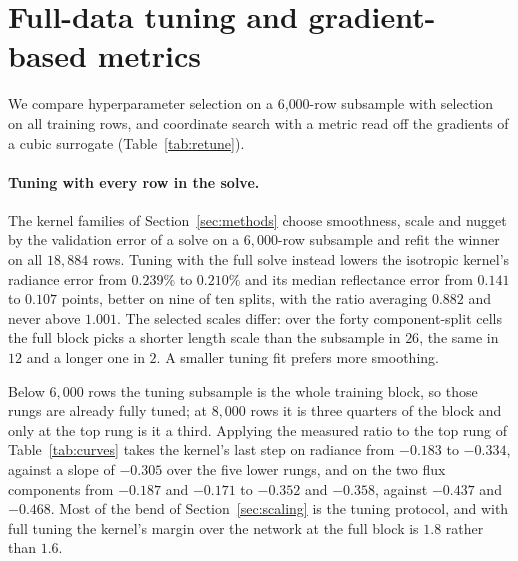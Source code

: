 \section{Full-data tuning and gradient-based metrics}\label{sec:retune}

We compare hyperparameter selection on a 6{,}000-row subsample with selection on all
training rows, and coordinate search with a metric read off the gradients of a cubic surrogate
(Table~\ref{tab:retune}).

\begin{table}[t]
\centering\small
\resizebox{\textwidth}{!}{}
\caption{Where the kernel's hyperparameters are chosen, and how its metric is obtained, at the
full training block and the same ten splits. The first pair tunes smoothness, scale and nugget
on a $6{,}000$-row subsample and on every training row; the last three rows replace the coordinate
search by a metric read off the cubic surrogate's gradients, at three exponents. Selecting the
exponent on validation, per split, chooses $p=1/2$ on all ten, so that row would repeat the
$p=1/2$ row and is omitted. Mean $\pm$ standard deviation over the ten splits.}
\label{tab:retune}
\end{table}

\paragraph{Tuning with every row in the solve.} The kernel families of
Section~\ref{sec:methods} choose smoothness, scale and nugget by the validation error of a solve
on a $6{,}000$-row subsample and refit the winner on all $18{,}884$ rows. Tuning with the full
solve instead lowers the isotropic kernel's radiance error from $0.239\%$ to $0.210\%$ and its
median reflectance error from $0.141$ to $0.107$ points, better on nine of ten splits, with the
ratio averaging $0.882$ and never above $1.001$. The selected scales differ: over the forty
component-split cells the full block picks a shorter length scale than the subsample in $26$,
the same in $12$ and a longer one in $2$. A smaller tuning fit prefers more smoothing.

Below $6{,}000$ rows the tuning subsample is the whole training block, so those rungs are
already fully tuned; at $8{,}000$ rows it is three quarters of the block and only at the top rung
is it a third. Applying the measured ratio to the top rung of Table~\ref{tab:curves} takes the
kernel's last step on radiance from $-0.183$ to $-0.334$, against a slope of $-0.305$ over the
five lower rungs, and on the two flux components from $-0.187$ and $-0.171$ to $-0.352$ and
$-0.358$, against $-0.437$ and $-0.468$. Most of the bend of Section~\ref{sec:scaling} is the
tuning protocol, and with full tuning the kernel's margin over the network at the full block is
$1.8$ rather than $1.6$.

